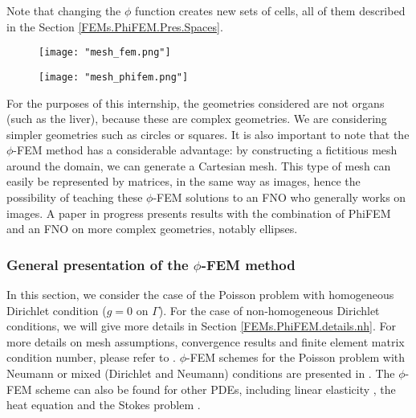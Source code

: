 \begin{Rem}
	Note that changing the $\phi$ function creates new sets of cells, all of them described in the Section \ref{FEMs.PhiFEM.Pres.Spaces}.
\end{Rem}

\begin{minipage}{0.52\linewidth}
	\begin{figure}[H]
		\centering
		\texttt{[image: "mesh\_fem.png"]}
		\label{mesh_fem}
	\end{figure}
\end{minipage} \;
\begin{minipage}{0.44\linewidth}
	\begin{figure}[H]
		\centering
		\texttt{[image: "mesh\_phifem.png"]}
		\label{mesh_phifem}
	\end{figure}
\end{minipage}

\begin{Rem}
	For the purposes of this internship, the geometries considered are not organs (such as the liver), because these are complex geometries. We are considering simpler geometries such as circles or squares. It is also important to note that the $\phi$-FEM method has a considerable advantage: by constructing a fictitious mesh around the domain, we can generate a Cartesian mesh. This type of mesh can easily be represented by matrices, in the same way as images, hence the possibility of teaching these $\phi$-FEM solutions to an FNO who generally works on images. A paper in progress presents results with the combination of PhiFEM and an FNO on more complex geometries, notably ellipses.
\end{Rem}

\subsubsection{General presentation of the $\phi$-FEM method} \label{FEMs.PhiFEM.Pres}

In this section, we consider the case of the Poisson problem with homogeneous Dirichlet condition ($g=0$ on $\Gamma$). For the case of non-homogeneous Dirichlet conditions, we will give more details in Section \ref{FEMs.PhiFEM.details.nh}. For more details on mesh assumptions, convergence results and finite element matrix condition number, please refer to \cite{duprez_phi-fem_2020}. $\phi$-FEM schemes for the Poisson problem with Neumann or mixed (Dirichlet and Neumann) conditions are presented in \cite{duprez_new_2023,cotin_phi-fem_nodate}. The $\phi$-FEM scheme can also be found for other PDEs, including linear elasticity \cite[Chapter~2]{cotin_phi-fem_nodate}, the heat equation \cite[Chapter~5]{cotin_phi-fem_nodate} and the Stokes problem  \cite{duprez_phi-fem_2023}.

